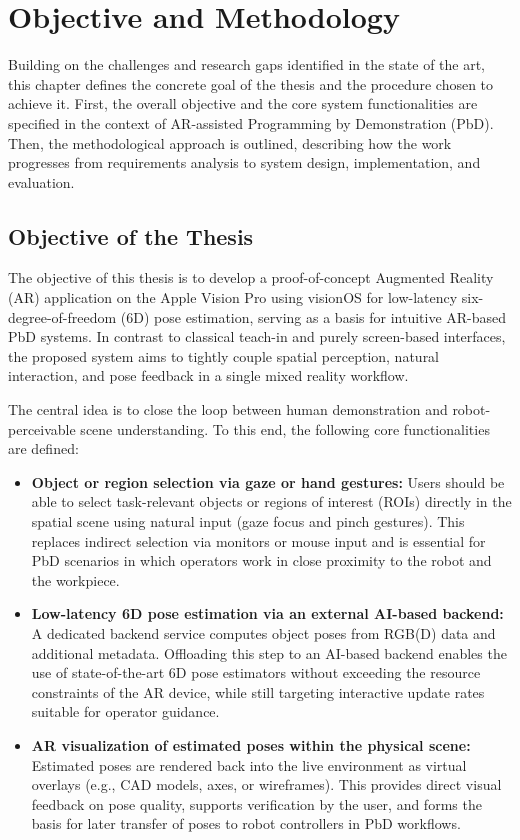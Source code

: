 \section{Objective and Methodology}

Building on the challenges and research gaps identified in the state of the art, this chapter defines the concrete goal of the thesis and the procedure chosen to achieve it. First, the overall objective and the core system functionalities are specified in the context of AR-assisted Programming by Demonstration (PbD). Then, the methodological approach is outlined, describing how the work progresses from requirements analysis to system design, implementation, and evaluation.

\subsection{Objective of the Thesis}

The objective of this thesis is to develop a proof-of-concept Augmented Reality (AR) application on the Apple Vision Pro using visionOS for low-latency six-degree-of-freedom (6D) pose estimation, serving as a basis for intuitive AR-based PbD systems. In contrast to classical teach-in and purely screen-based interfaces, the proposed system aims to tightly couple spatial perception, natural interaction, and pose feedback in a single mixed reality workflow.

The central idea is to close the loop between human demonstration and robot-perceivable scene understanding. To this end, the following core functionalities are defined:

\begin{itemize}
    \item \textbf{Object or region selection via gaze or hand gestures:} 
    Users should be able to select task-relevant objects or regions of interest (ROIs) directly in the spatial scene using natural input (gaze focus and pinch gestures). This replaces indirect selection via monitors or mouse input and is essential for PbD scenarios in which operators work in close proximity to the robot and the workpiece.

    \item \textbf{Low-latency 6D pose estimation via an external AI-based backend:}
    A dedicated backend service computes object poses from RGB(D) data and additional metadata. Offloading this step to an AI-based backend enables the use of state-of-the-art 6D pose estimators without exceeding the resource constraints of the AR device, while still targeting interactive update rates suitable for operator guidance.

    \item \textbf{AR visualization of estimated poses within the physical scene:}
    Estimated poses are rendered back into the live environment as virtual overlays (e.g., CAD models, axes, or wireframes). This provides direct visual feedback on pose quality, supports verification by the user, and forms the basis for later transfer of poses to robot controllers in PbD workflows.
\end{itemize}

